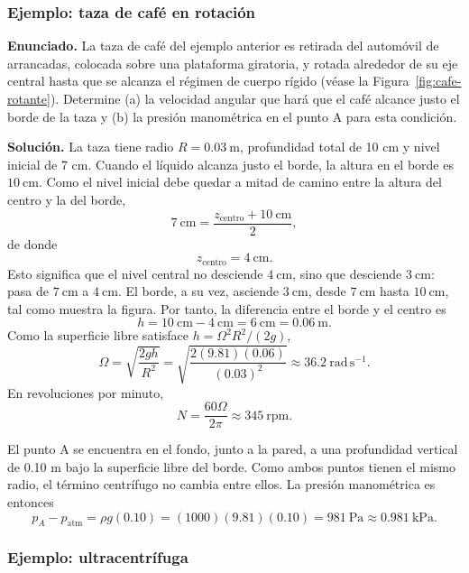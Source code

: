 \figuraConservacionVolumenRotante

\subsubsection*{Ejemplo: taza de café en rotación}

\textbf{Enunciado.} La taza de café del ejemplo anterior es retirada del automóvil de arrancadas, colocada sobre una plataforma giratoria, y rotada alrededor de su eje central hasta que se alcanza el régimen de cuerpo rígido (véase la Figura~\ref{fig:cafe-rotante}). Determine (a) la velocidad angular que hará que el café alcance justo el borde de la taza y (b) la presión manométrica en el punto A para esta condición.

\figuraCafeRotante

\textbf{Solución.} La taza tiene radio $R=0.03\ \mathrm{m}$, profundidad total de 10 cm y nivel inicial de 7 cm. Cuando el líquido alcanza justo el borde, la altura en el borde es $10\ \mathrm{cm}$. Como el nivel inicial debe quedar a mitad de camino entre la altura del centro y la del borde,
$$
7\ \mathrm{cm}=\frac{z_{\mathrm{centro}}+10\ \mathrm{cm}}{2},
$$
de donde
$$
z_{\mathrm{centro}}=4\ \mathrm{cm}.
$$
Esto significa que el nivel central no desciende $4\ \mathrm{cm}$, sino que desciende $3\ \mathrm{cm}$: pasa de $7\ \mathrm{cm}$ a $4\ \mathrm{cm}$. El borde, a su vez, asciende $3\ \mathrm{cm}$, desde $7\ \mathrm{cm}$ hasta $10\ \mathrm{cm}$, tal como muestra la figura. Por tanto, la diferencia entre el borde y el centro es
$$ h=10\ \mathrm{cm}-4\ \mathrm{cm}=6\ \mathrm{cm}=0.06\ \mathrm{m}. $$
Como la superficie libre satisface $h=\Omega^2R^2/(2g)$,
$$ \Omega=\sqrt{\frac{2gh}{R^2}}
=\sqrt{\frac{2(9.81)(0.06)}{(0.03)^2}}
\approx 36.2\ \mathrm{rad\,s^{-1}}. $$
En revoluciones por minuto,
$$ N=\frac{60\Omega}{2\pi}\approx 345\ \mathrm{rpm}. $$

El punto A se encuentra en el fondo, junto a la pared, a una profundidad vertical de 0.10 m bajo la superficie libre del borde. Como ambos puntos tienen el mismo radio, el término centrífugo no cambia entre ellos. La presión manométrica es entonces
$$ p_A-p_{\mathrm{atm}}=\rho g(0.10)
=(1000)(9.81)(0.10)
=981\ \mathrm{Pa}\approx 0.981\ \mathrm{kPa}. $$

\pagebreak[3]
\subsubsection*{Ejemplo: ultracentrífuga}

